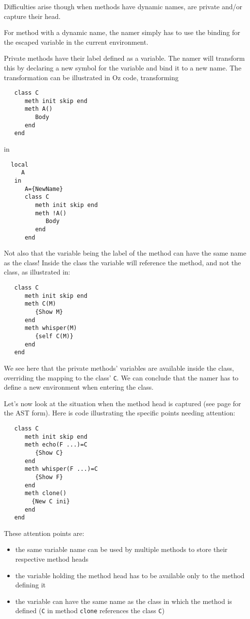 \documentclass[a4paper]{memoir}
\begin{document}
Difficulties arise though when methods have dynamic names, are private and/or
capture their head.

For method with a dynamic name, the namer simply has to use the binding for the
escaped variable in the current environment.

Private methods have their label defined as a variable. The namer will transform this by 
declaring a new symbol for the variable and bind it to a new name.
The transformation can be illustrated in Oz code, transforming

\begin{lstlisting}
   class C
      meth init skip end
      meth A()
         Body
      end
   end
\end{lstlisting}

in

\begin{lstlisting}
  local
     A
   in
      A={NewName}
      class C
         meth init skip end
         meth !A()
            Body
         end
      end
\end{lstlisting}

Not also that the variable being the label of the method can have the same name
as the class! Inside the class the variable will reference the method, and not the class, 
as illustrated in: 
\begin{lstlisting}
   class C
      meth init skip end
      meth C(M)
         {Show M}
      end
      meth whisper(M)
         {self C(M)}
      end
   end
\end{lstlisting}
We see here that the private methods' variables are available inside the class, overriding the mapping to the class' \lstinline!C!.
 We can conclude that the namer has to define a new environment when entering the class.

Let's now look at the situation when the method head is captured (see page
\pageref{compilerinput:classes:headcapture} for the AST form).
Here is code illustrating the specific points needing attention:
\begin{lstlisting}
   class C
      meth init skip end
      meth echo(F ...)=C
         {Show C}
      end
      meth whisper(F ...)=C
         {Show F}
      end
      meth clone()
        {New C ini}
      end
   end
\end{lstlisting}
These attention points are:
\begin{itemize}
  \item the same variable name can be used by multiple methods to store their
    respective method heads
  \item the variable holding the method head has to be available only to the
    method defining it
  \item the variable can have the same name as the class in which the method is
    defined (\lstinline!C! in method \lstinline!clone! references the class \lstinline!C!)
\end{itemize}
\end{document}
